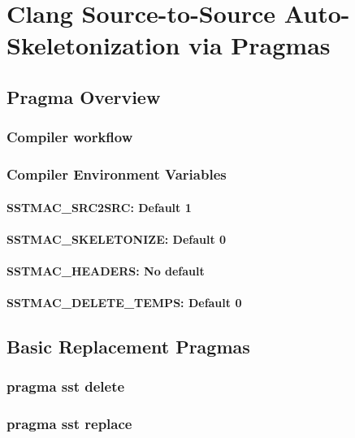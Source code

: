 
\chapter{Clang Source-to-Source Auto-Skeletonization via Pragmas}
\label{clangTutorial}

\section{Pragma Overview}

\subsection{Compiler workflow}

\subsection{Compiler Environment Variables}

\subsubsection{SSTMAC\_SRC2SRC: Default 1}

\subsubsection{SSTMAC\_SKELETONIZE: Default 0}

\subsubsection{SSTMAC\_HEADERS: No default}

\subsubsection{SSTMAC\_DELETE\_TEMPS: Default 0}

\section{Basic Replacement Pragmas}
\subsection{pragma sst delete}
\subsection{pragma sst replace}
